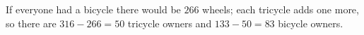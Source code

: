 If everyone had a bicycle there would be $266$ wheels; each tricycle adds one more, so there are $316-266=50$ tricycle owners and $133-50=\boxed{83}$ bicycle owners.
